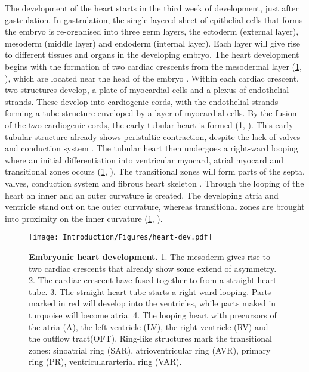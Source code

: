 The development of the heart starts in the third week of development, just after gastrulation. In gastrulation, the single-layered sheet of epithelial cells that forms the embryo is re-organised into three germ layers, the ectoderm (external layer), mesoderm  (middle layer) and endoderm (internal layer). Each layer will give rise to different tissues and organs in the developing embryo. The heart development begins with the formation of two cardiac crescents from the mesodermal layer (\cref{fig:dev-heart}, ), which are located near the head of the embryo \citep{Christoffels2000}. Within each cardiac crescent, two structures develop, a plate of myocardial cells and a plexus of endothelial strands. These develop into cardiogenic cords, with the endothelial strands forming a tube structure enveloped  by a layer of myocardial cells. By the fusion of the two cardiogenic cords, the early tubular heart is formed (\cref{fig:dev-heart}, ). This early tubular structure already shows peristaltic contraction, despite the lack of valves and conduction system \citep{Goss1938,deJong1992,Moorman1994}. The tubular heart then undergoes a right-ward looping where an initial differentiation into ventricular myocard, atrial myocard and transitional zones occurs (\cref{fig:dev-heart}, ). The transitional zones will form parts of the septa, valves, conduction system and fibrous heart skeleton \citep{Gittenberger-deGroot2005}. Through the looping of the heart an inner and an outer curvature is created. The developing atria and ventricle stand out on the outer curvature, whereas transitional zones are brought into proximity on the inner curvature (\cref{fig:dev-heart}, ). 

\begin{figure}[hbtp]
	\centering
	\texttt{[image: Introduction/Figures/heart-dev.pdf]}
	\caption[\textbf{Embryonic heart development. }]{\textbf{Embryonic heart development. } 1. The mesoderm gives rise to two cardiac crescents that already show some extend of asymmetry. 2. The cardiac crescent have fused together to from a straight heart tube. 3. The straight heart tube starts a right-ward looping. Parts marked in red will develop into the ventricles, while parts maked in turquoise will become atria. 4. The looping heart with precursors of the atria (A), the left ventricle (LV), the right ventricle (RV) and the outflow tract(OFT). Ring-like structures mark the transitional zones: sinoatrial ring (SAR), atrioventricular ring (AVR), primary ring (PR), ventriculararterial ring (VAR).} 
	 	\label{fig:dev-heart}
\end{figure}


